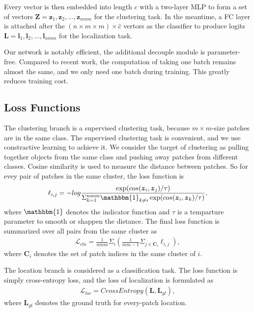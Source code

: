 \documentclass[final]{cvpr}
\begin{document}
Every vector is then embedded into length $c$ with a two-layer MLP to form a set of vectors $\mathbf{Z} = {\boldsymbol{z}_1, \boldsymbol{z}_2, ..., \boldsymbol{z}_{nmm}}$ for the clustering task. In the meantime, a FC layer is attached after the $(n\times m \times m) \times \hat{c}$ vertors as the classifier to produce logits $\mathbf{L} = {\boldsymbol{l}_1, \boldsymbol{l}_2, ..., \boldsymbol{l}_{nmm}}$ for the localization task.

Our network is notably efficient, the additional decouple module is parameter-free. Compared to recent work, the computation of taking one batch remains almost the same, and we only need one batch during training. This greatly reduces training cost.


\subsection{Loss Functions}
\label{sec:loss}
The clustering branch is a supervised clustering task, because $m\times m$-size patches are in the same class. The supervised clustering task is convenient, and we use constractive learning to achieve it. We consider the target of clustering as pulling together objects from the same class and pushing away patches from different classes. Cosine similarity is used to measure the distance between patches. So for evey pair of patches in the same cluster, the loss function is
\begin{align}
\ell_{i,j} = - log \frac{\exp(cos(\boldsymbol{z}_i,\boldsymbol{z}_j)/\tau)}{\Sigma_{k=1}^{nmm}\mathbbm{1}_{k\neq i} \exp(cos(\boldsymbol{z}_i,\boldsymbol{z}_k)/\tau)},
\end{align}
where $\mathbbm{1}$ denotes the indicator function and $\tau$ is a temparture parameter to smooth or shappen the distance. The final loss function is summarized over all pairs from the same cluster as
\begin{align}
\mathcal{L}_{clu} = \frac{1}{nmm}\Sigma_{i}\left( \frac{1}{mm-1}\Sigma_{j\in \mathbf{C}_i}\ell_{i,j} \right),
\end{align}
where $\mathbf{C}_i$ denotes the set of patch indices in the same cluster of $i$.

The location branch is considered as a classification task. The loss function is simply cross-entropy loss, and the loss of localization is formulated as
\begin{align}
\mathcal{L}_{loc} = CrossEntropy(\mathbf{L}, \mathbf{L}_{gt}),
\end{align}
where $\mathbf{L}_{gt}$ denotes the ground truth for every-patch location.
\end{document}
